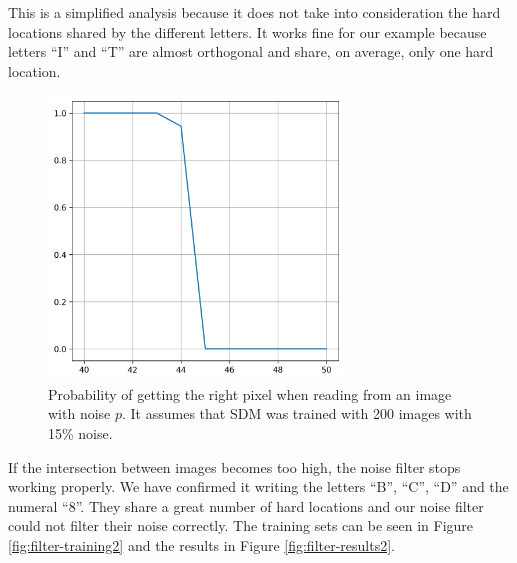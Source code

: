 This is a simplified analysis because it does not take into consideration the hard locations shared by the different letters. It works fine for our example because letters ``I'' and ``T'' are almost orthogonal and share, on average, only one hard location.

\begin{figure}[!htb]
\centering\includegraphics[width=0.7\textwidth]{./images02/filter/prob-right-pixel.png}
\caption{Probability of getting the right pixel when reading from an image with noise $p$. It assumes that SDM was trained with 200 images with 15\% noise.
\label{fig:filter-prob-right-pixel}
}
\end{figure}

If the intersection between images becomes too high, the noise filter stops working properly. We have confirmed it writing the letters ``B'', ``C'', ``D'' and the numeral ``8''. They share a great number of hard locations and our noise filter could not filter their noise correctly. The training sets can be seen in Figure \ref{fig:filter-training2} and the results in Figure \ref{fig:filter-results2}.


